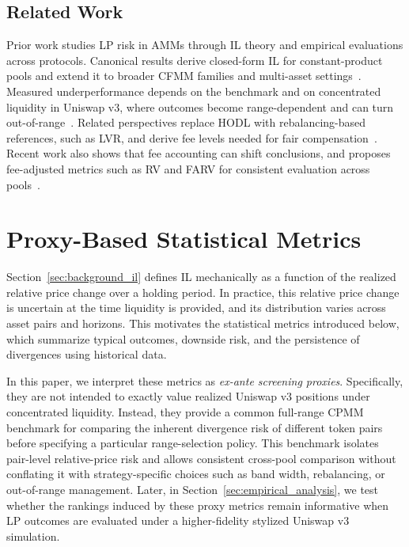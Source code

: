 \documentclass[anonymous]{lipics-v2021}
\begin{document}
\subsection{Related Work}
Prior work studies LP risk in AMMs through IL theory and empirical evaluations across protocols. 
Canonical results derive closed-form IL for constant-product pools and extend it to broader CFMM families and multi-asset settings~\cite{tiruviluamala2022general}. 
Measured underperformance depends on the benchmark and on concentrated liquidity in Uniswap v3, where outcomes become range-dependent and can turn out-of-range~\cite{aigner2021uniswap, loesch2021impermanent, heimbach2022risks}. 
Related perspectives replace HODL with rebalancing-based references, such as LVR, and derive fee levels needed for fair compensation~\cite{milionis2022quantifying, milionis2022automated, cohen2023inefficiency}.
Recent work also shows that fee accounting can shift conclusions, and proposes fee-adjusted metrics such as RV and FARV for consistent evaluation across pools~\cite{roman2025impact, tangri2023generalizing}.



\section{Proxy-Based Statistical Metrics}
\label{sec:metrics}

{Section~\ref{sec:background_il} defines IL mechanically as a function of the realized relative price change over a holding period. In practice, this relative price change is uncertain at the time liquidity is provided, and its distribution varies across asset pairs and horizons. This motivates the statistical metrics introduced below, which summarize typical outcomes, downside risk, and the persistence of divergences using historical data.}

{In this paper, we interpret these metrics as \emph{ex-ante screening proxies}. Specifically, they are not intended to exactly value realized Uniswap v3 positions under concentrated liquidity. Instead, they provide a common full-range CPMM benchmark for comparing the inherent divergence risk of different token pairs before specifying a particular range-selection policy. This benchmark isolates pair-level relative-price risk and allows consistent cross-pool comparison without conflating it with strategy-specific choices such as band width, rebalancing, or out-of-range management. Later, in Section~\ref{sec:empirical_analysis}, we test whether the rankings induced by these proxy metrics remain informative when LP outcomes are evaluated under a higher-fidelity stylized Uniswap v3 simulation.}
\end{document}
